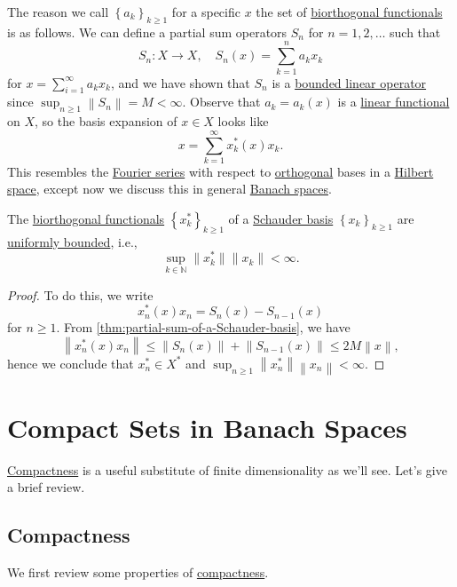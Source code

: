 The reason we call \(\left\{ a_k \right\} _{k\geq 1}\) for a specific \(x\) the set of \hyperref[def:biorthogonal-functional]{biorthogonal functionals} is as follows. We can define a partial sum operators \(S_n\) for \(n = 1, 2, \ldots  \) such that
\[
	S_n\colon X\to X,\quad S_n (x) = \sum\limits_{k=1}^{n} a_k x_k
\]
for \(x = \sum_{i=1}^{\infty }a_k x_k\), and we have shown that \(S_n\) is a \hyperref[def:bounded-linear-op]{bounded linear operator} since \(\sup _{n\geq 1} \left\lVert S_n\right\rVert = M < \infty \). Observe that \(a_k = a_k(x)\) is a \hyperref[def:linear-functional]{linear functional} on \(X\), so the basis expansion of \(x\in X\) looks like
\[
	x = \sum_{k=1}^{\infty} x^{\ast} _k(x) x_k.
\]
This resembles the \hyperref[def:Fourier-series]{Fourier series} with respect to \hyperref[def:orthogonal-system]{orthogonal} bases in a \hyperref[def:Hilbert-space]{Hilbert space}, except now we discuss this in general \hyperref[def:Banach-space]{Banach spaces}.

\begin{proposition}
	The \hyperref[def:biorthogonal-functional]{biorthogonal functionals} \(\left\{ x_k^{\ast} \right\} _{k\geq 1}\) of a \hyperref[def:Schauder-basis]{Schauder basis} \(\left\{ x_k \right\} _{k\geq 1}\) are \hyperref[def:uniformly-bounded]{uniformly bounded}, i.e.,
	\[
		\sup _{k\in \mathbb{N} }\lVert x_k ^{\ast}  \rVert \lVert x_{k}  \rVert < \infty .
	\]
\end{proposition}
\begin{proof}
	To do this, we write
	\[
		x_n^{\ast} (x) x_n = S_n(x) - S_{n-1}(x)
	\]
	for \(n \geq 1\). From \autoref{thm:partial-sum-of-a-Schauder-basis}, we have
	\[
		\left\lVert x^{\ast} _n(x)x_n\right\rVert \leq \left\lVert S_n(x)\right\rVert + \left\lVert S_{n-1}(x) \right\rVert \leq 2M \left\lVert x\right\rVert,
	\]
	hence we conclude that \(x_n^{\ast} \in X^{\ast} \) and \(\sup _{n\geq 1} \left\lVert x_n^{\ast} \right\rVert \left\lVert x_n\right\rVert < \infty \).
\end{proof}

\section{Compact Sets in Banach Spaces}
\hyperref[def:compact]{Compactness} is a useful substitute of finite dimensionality as we'll see. Let's give a brief review.
\subsection{Compactness}
We first review some properties of \hyperref[def:compact]{compactness}.

